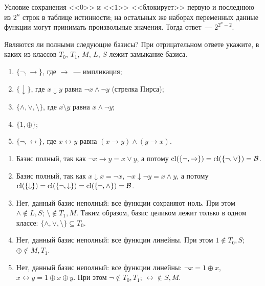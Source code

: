 \begin{Answer}
    \noindent
    Условие сохранения <<$ 0 $>> и <<$ 1 $>> <<блокирует>> первую и последнюю из $ 2^n $ строк в таблице истинности;
    на остальных же наборах переменных данные функции могут принимать произвольные значения.
    Тогда ответ~--- $ 2^{2^n - 2} $.
\end{Answer}


\begin{Exercise}[counter=SecExercise, label={exercise:boolean:Post_example}]
    \noindent
    Являются ли полными следующие базисы?
    При отрицательном ответе укажите, в каких из классов $ T_0 $, $ T_1 $, $ M $, $ L $, $ S $ лежит замыкание базиса.
    \begin{enumerate}[label=\textbf{\alph*)}]
        \item $ \{ \neg, \rightarrow \} $, где $ \rightarrow $~--- импликация;
        \item $ \{ \downarrow \} $, где $ x \downarrow y $ равна $ \neg x \wedge \neg y $ (стрелка Пирса);
        \item $ \{ \wedge, \vee, \setminus \} $, где $ x \setminus y $ равна $ x \wedge \neg y $;
        \item $ \{ 1, \oplus \} $;
        \item $ \{ \neg, \leftrightarrow \} $, где $ x \leftrightarrow y $ равна $ (x \rightarrow y) \wedge (y \rightarrow x) $.
    \end{enumerate}
\end{Exercise}

\begin{Answer}
    \noindent
    \begin{enumerate}[label=\textbf{\alph*)}]
        \item
            Базис полный, так как $ \neg x \rightarrow y = x \vee y $,
            а потому $ \operatorname*{\textnormal{cl}}(\{\neg, \rightarrow\}) = \operatorname*{\textnormal{cl}}(\{\neg, \vee\}) = \mathcal{B} $.
        \item
            Базис полный, так как $ x \downarrow x = \neg x $,
            $ \neg x \downarrow \neg y = x \wedge y $,
            а потому $ \operatorname*{\textnormal{cl}}(\{ \downarrow \}) = \operatorname*{\textnormal{cl}}(\{\neg, \downarrow\}) = \operatorname*{\textnormal{cl}}(\{\neg, \wedge\}) = \mathcal{B} $.
        \item
            Нет, данный базис неполный: все функции сохраняют ноль.
            При этом $ \wedge \notin L, S $; $ \setminus \notin T_1, M $.
            Таким образом, базис целиком лежит только в одном классе: $ \{\wedge, \vee, \setminus \} \subseteq T_0 $.
        \item
            Нет, данный базис неполный: все функции линейны.
            При этом $ 1 \notin T_0, S $; $ \oplus \notin M, T_1 $.
        \item
            Нет, данный базис неполный: все функции линейны: $ \neg x = 1 \oplus x $, $ x \leftrightarrow y = 1 \oplus x \oplus y $.
            При этом $ \neg \notin T_0, T_1 $; $ \leftrightarrow \notin S, M $.
    \end{enumerate}
\end{Answer}


